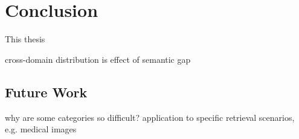 \chapter{Conclusion}\label{ch:conclusion}

This thesis 

cross-domain distribution is effect of semantic gap

\section{Future Work}\label{sec:conclusion_future_work}

why are some categories so difficult?
application to specific retrieval scenarios, e.g. medical images
